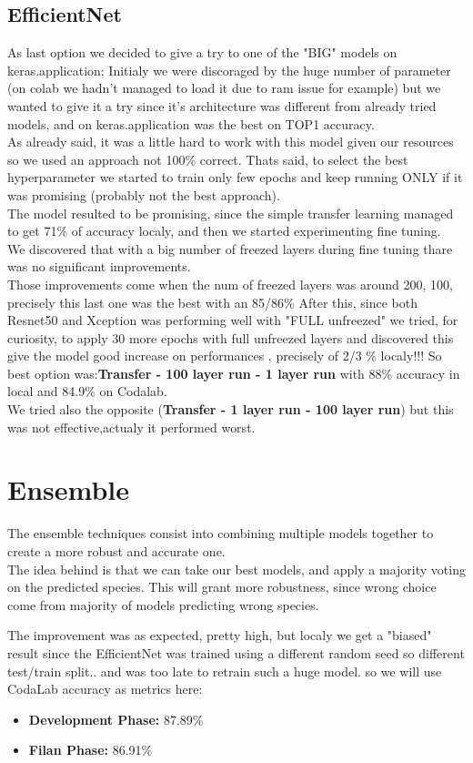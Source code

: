 \documentclass[10pt]{article}
\begin{document}
\subsection{EfficientNet}
As last option we decided to give a try to one of the "BIG" models on keras.application;
Initialy we were discoraged by the huge number of parameter (on colab we hadn't managed to load it due to ram issue for example)
but we wanted to give it a try since it's architecture was different from already tried models, and on keras.application was the best on TOP1 accuracy.\\
As already said, it was a little hard to work with this model given our resources so we used an approach not 100\% correct.
Thats said, to select the best hyperparameter we started to train only few epochs and keep running ONLY if it was promising (probably not the best approach).\\
The model resulted to be promising, since the simple transfer learning managed to get 71\% of accuracy localy, and then we started experimenting fine tuning.\\
We discovered that with a big number of freezed layers during fine tuning thare was no significant improvements.\\
Those improvements come when the num of freezed layers was around 200, 100, precisely this last one was the best with an 85/86\% 
After this, since both Resnet50 and Xception was performing well with "FULL unfreezed" we tried, for curiosity, to apply 30 more epochs with full unfreezed layers and discovered this give the model good increase on performances , precisely of 2/3 \% localy!!!
So best option was:\textbf{Transfer - 100 layer run - 1 layer run} with 88\% accuracy in local and 84.9\% on Codalab.\\
We tried also the opposite (\textbf{Transfer - 1 layer run - 100 layer run}) but this was not effective,actualy it performed worst.


\section{Ensemble}
The ensemble techniques consist into combining multiple models together to create a more robust and accurate one.\\
The idea behind is that we can take our best models, and apply a majority voting on the predicted species.
This will grant more robustness, since wrong choice come from majority of models predicting wrong species.

The improvement was as expected, pretty high, but localy we get a "biased" result since the EfficientNet was trained using a different random seed so different test/train split.. and was too late to retrain such a huge model.
so we will use CodaLab accuracy as metrics here:
\begin{itemize}
  \item \textbf{Development Phase:} 87.89\%
  \item \textbf{Filan Phase:} 86.91\%
\end{itemize}
\end{document}
